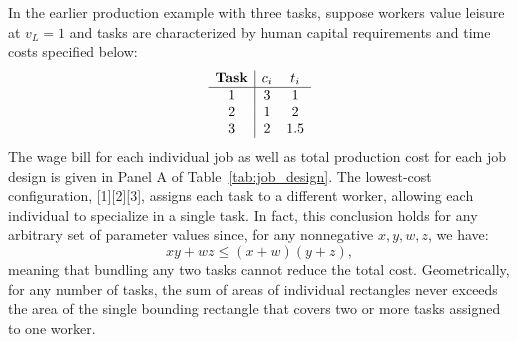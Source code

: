 \documentclass{article}
\theoremstyle{plain}
\theoremstyle{plain}
\begin{document}
In the earlier  production example with three tasks, suppose workers value leisure at $v_L = 1$ and tasks are characterized by human capital requirements and time costs specified below:
\[
\begin{array}{c|ccc}
\textbf{Task} & c_{i} & t_{i} \\ \hline
1 & 3  & 1 \\
2 & 1 & 2  \\
3 & 2   & 1.5 \\
\end{array}
\]
The wage bill for each individual job as well as total production cost for each job design is given in Panel A of Table~\ref{tab:job_design}.
The lowest‐cost configuration, [1][2][3], assigns each task to a different worker, allowing each individual to specialize in a single task.  
In fact, this conclusion holds for any arbitrary set of parameter values since, for any nonnegative $x,y,w,z$, we have:
\[
  xy + wz \le (x + w)(y + z),
\]
meaning that bundling any two tasks cannot reduce the total cost.  
Geometrically, for any number of tasks, the sum of areas of individual rectangles never exceeds the area of the single bounding rectangle that covers two or more tasks assigned to one worker.
\end{document}

